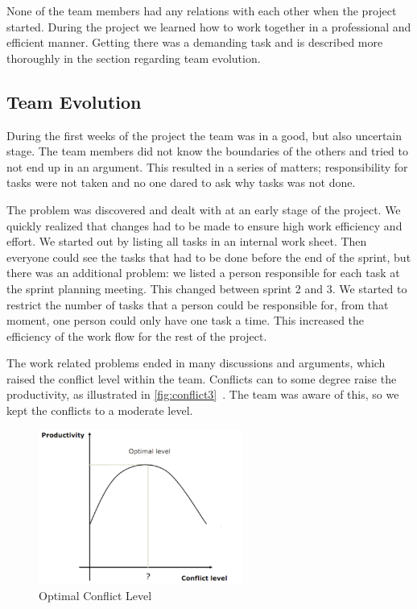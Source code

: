 None of the team members had any relations with each other when the project started. During the project we learned how to work together in a professional and efficient manner. Getting there was a demanding task and is described more thoroughly in the section regarding team evolution.

\subsection{Team Evolution}
During the first weeks of the project the team was in a good, but also uncertain stage. The team members did not know the boundaries of the others and tried to not end up in an argument. This resulted in a series of matters; responsibility for tasks were not taken and no one dared to ask why tasks was not done.

The problem was discovered and dealt with at an early stage of the project. We quickly realized that changes had to be made to ensure high work efficiency and effort. We started out by listing all tasks in an internal work sheet. Then everyone could see the tasks that had to be done before the end of the sprint, but there was an additional problem: we listed a person responsible for each task at the sprint planning meeting. This changed between sprint 2 and 3. We started to restrict the number of tasks that a person could be responsible for, from that moment, one person could only have one task a time. This increased the efficiency of the work flow for the rest of the project.

The work related problems ended in many discussions and arguments, which raised the conflict level within the team. Conflicts can to some degree raise the productivity, as illustrated in \autoref{fig:conflict3}~\cite{favio}. The team was aware of this, so we kept the conflicts to a moderate level.
\begin{figure}[htb]
	\center
	\includegraphics[width=0.6\textwidth]{./evaluation/img/conflict3}
	\caption{Optimal Conflict Level \label{fig:conflict3}}
\end{figure}

